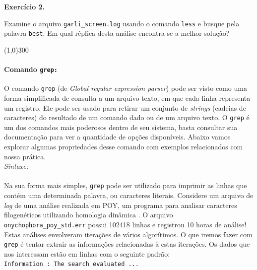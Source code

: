 \begin{refsection}
\begin{blackBlock}{\textbf{Exercício 2.}}\label{tut2:ex:2.\arabic{ex}}

Examine o arquivo \texttt{garli\_screen.log} usando o comando \texttt{less} e busque pela palavra \texttt{best}. Em qual réplica desta análise encontra-se a melhor solução?
\begin{center}
\line(1,0){300}\\
\end{center}

\end{blackBlock}

\paragraph{Comando \texttt{grep:}}\label{tut2:text:editors:texttools:grep}

O comando \texttt{grep} (de \textit{Global regular expression parser}) pode ser visto como uma forma simplificada de consulta a um arquivo texto, em que cada linha representa um registro. Ele pode ser usado para retirar um conjunto de \textit{strings} (cadeias de caracteres) do resultado de um comando dado ou de um arquivo texto. O \texttt{grep} é um dos comandos mais poderosos dentro de seu sistema, basta consultar sua documentação para ver a quantidade de opções disponíveis. Abaixo vamos explorar algumas propriedades desse comando com exemplos relacionados com nossa prática.\\
\textit{Sintaxe:}\\
 \\

Na sua forma mais simples, \texttt{grep} pode ser utilizado para imprimir as linhas que contém uma determinada palavra, ou caracteres literais. Considere um arquivo de \textit{log} de uma análise realizada em POY, um programa para analisar caracteres filogenéticos utilizando homologia dinâmica \parencite{VaronETAL_2010}. O arquivo \texttt{onychophora\_poy\_std.err} possui 102418 linhas e registrou 10 horas de análise! Estas análises envolveram iterações de vários algorítimos. O que iremos fazer com \texttt{grep} é tentar extrair as informações relacionadas à estas iterações. Os dados que nos interessam estão em linhas com o seguinte padrão:\\

\texttt{Information : The search evaluated ...}\\


\end{refsection}
